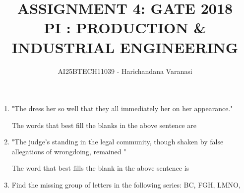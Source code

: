 \documentclass[journal,12pt,onecolumn]{IEEEtran}
\theoremstyle{remark}
\begin{document}
\title{
ASSIGNMENT 4: GATE 2018  \\
PI : PRODUCTION \& INDUSTRIAL ENGINEERING}
\author{AI25BTECH11039 - Harichandana Varanasi }
\maketitle
\renewcommand{\thefigure}{\theenumi}
\renewcommand{\thetable}{\theenumi}
\begin{enumerate}
    \item "The dress \underline{\hspace{2cm}} her so well that they all immediately \underline{\hspace{2cm}} her on her appearance."
    
    The words that best fill the blanks in the above sentence are
    \hfill{}
    
    \begin{enumerate}
    \end{enumerate}

    \item "The judge's standing in the legal community, though shaken by false allegations of wrongdoing, remained \underline{\hspace{2cm}}"
    
    The word that best fills the blank in the above sentence is
    \hfill{}

    \begin{enumerate}
    \end{enumerate}

    \item Find the missing group of letters in the following series: BC, FGH, LMNO, \underline{\hspace{2cm}}
    \hfill{}


\end{enumerate}
\end{document}
